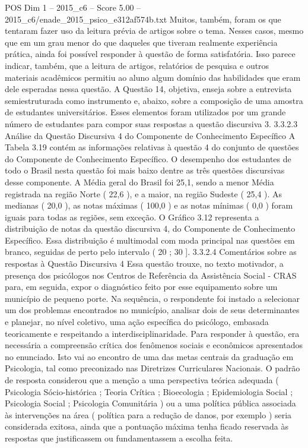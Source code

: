 \begin{textsample}{POS Dim 1 – 2015\_c6 – Score 5.00 – 2015\_c6/enade\_2015\_psico\_e312af574b.txt}
Muitos, também, foram os que tentaram fazer uso da leitura prévia de artigos sobre o tema.
Nesses casos, mesmo que em um grau menor do que daqueles que tiveram realmente experiência prática, ainda foi possível responder à questão de forma satisfatória.
Isso parece indicar, também, que a leitura de artigos, relatórios de pesquisa e outros materiais acadêmicos permitiu ao aluno algum domínio das habilidades que eram dele esperadas nessa questão.
A Questão 14, objetiva, enseja sobre a entrevista semiestruturada como instrumento e, abaixo, sobre a composição de uma amostra de estudantes universitários.
Esses elementos foram utilizados por um grande número de estudantes para compor suas respostas a questão discursiva 3. 3.3.2.3 Análise da Questão Discursiva 4 do Componente de Conhecimento Específico A Tabela 3.19 contém as informações relativas à questão 4 do conjunto de questões do Componente de Conhecimento Específico.
O desempenho dos estudantes de todo o Brasil nesta questão foi mais baixo dentre as três questões discursivas desse componente.
A Média geral do Brasil foi 25,1, sendo a menor Média registrada na região Norte ( 22,6 ), e a maior, na região Sudeste ( 25,4 ).
As medianas ( 20,0 ), as notas máximas ( 100,0 ) e as notas mínimas ( 0,0 ) foram iguais para todas as regiões, sem exceção.
O Gráfico 3.12 representa a distribuição de notas da questão discursiva 4, do Componente de Conhecimento Específico.
Essa distribuição é multimodal com moda principal nas questões em branco, seguidas de perto pelo intervalo ( 20 ; 30 ]. 3.3.2.4 Comentários sobre as respostas à Questão Discursiva 4 Essa questão trouxe, no texto motivador, a presença dos psicólogos nos Centros de Referência da Assistência Social - CRAS para, em seguida, expor o diagnóstico feito por esse equipamento sobre um município de pequeno porte.
Na sequência, o respondente foi instado a selecionar um dos problemas encontrados no município, analisar dois de seus determinantes e planejar, no nível coletivo, uma ação específica do psicólogo, embasada teoricamente e respeitando a interdisciplinaridade.
Para responder à questão, era necessária a compreensão crítica dos fenômenos sociais e econômicos apresentados no enunciado.
Isto vai ao encontro de uma das metas centrais da graduação em Psicologia, tal como preconizado nas Diretrizes Curriculares Nacionais.
O padrão de resposta considerou que a menção a uma perspectiva teórica adequada ( Psicologia Sócio-histórica ; Teoria Crítica ; Bioecologia ; Epidemiologia Social ; Psicologia Social ; Psicologia Comunitária ) ou a uma política pública associada às intervenções na área ( política para a redução de danos, por exemplo ) seria considerada exitosa, ainda que a pontuação máxima tenha ficado reservada às respostas que justificassem ou fundamentassem a escolha feita.

\end{textsample}
